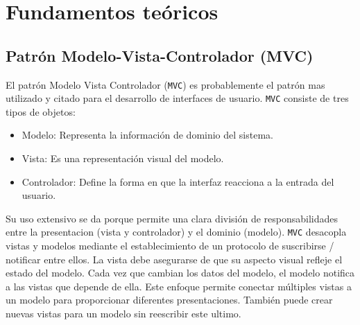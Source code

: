 \chapter{Fundamentos teóricos}

\section{Patrón Modelo-Vista-Controlador (MVC)}
El patrón Modelo Vista Controlador (\texttt{MVC}) es probablemente el patrón
mas utilizado y citado para el desarrollo de interfaces de usuario.
\texttt{MVC} consiste de tres tipos de objetos:

\begin{itemize}
\item Modelo: Representa la información de dominio del sistema.
\item Vista: Es una representación visual del modelo.
\item Controlador: Define la forma en que la interfaz reacciona a la entrada
  del usuario.
\end{itemize}

Su uso extensivo se da porque permite una clara división de responsabilidades
entre la presentacion (vista y controlador) y el dominio (modelo).
\texttt{MVC} desacopla vistas y modelos mediante el establecimiento de un
protocolo de suscribirse / notificar entre ellos. La vista debe asegurarse
de que su aspecto visual refleje el estado del modelo. Cada vez que cambian
los datos del modelo, el modelo notifica a las vistas que depende de ella.
Este enfoque permite conectar múltiples vistas a un modelo para proporcionar
diferentes presentaciones. También puede crear nuevas vistas para un modelo
sin reescribir este ultimo.


